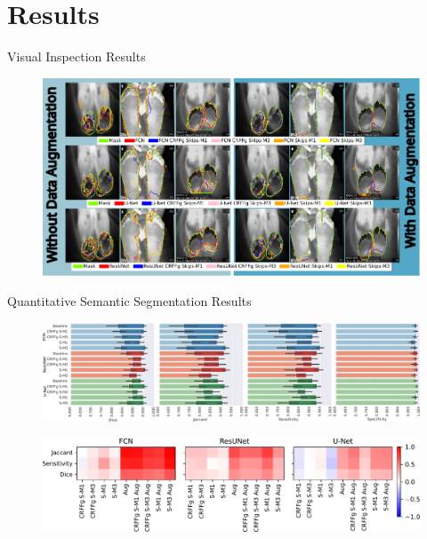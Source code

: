 \documentclass[aspectratio=169]{beamer}
\begin{document}
\section{Results}



\begin{frame}{Visual Inspection Results}

\begin{figure}
    \centering
    \includegraphics[width=0.87\linewidth]{Figures/visual_inspection.pdf}
\end{figure}

\end{frame}

\begin{frame}{Quantitative Semantic Segmentation Results}
    \begin{figure}
        \centering \includegraphics[width=1\linewidth]{Figures/results_infrared_thermal_feet.pdf}
    \end{figure}
    \begin{figure}
        \centering \includegraphics[width=0.695\linewidth]{Figures/baseline_models.pdf}
    \end{figure}
\end{frame}
\end{document}
